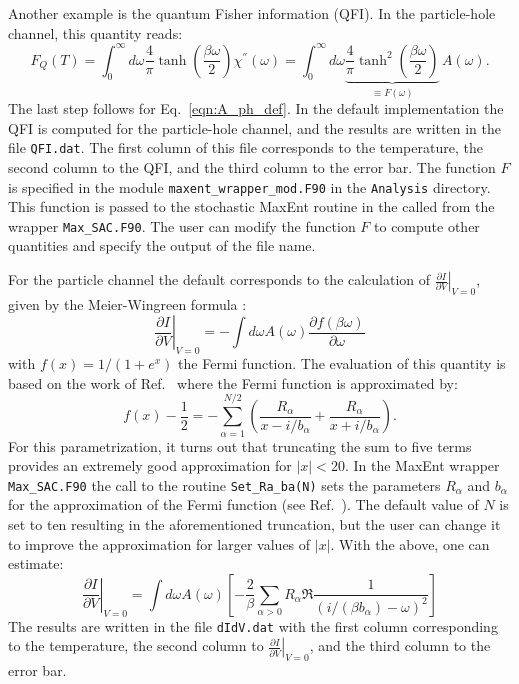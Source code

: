Another  example is  the  quantum Fisher  information \cite{Hauke16} (QFI).  In the particle-hole channel,  this  quantity  reads: 
\begin{equation}
   F_Q(T) =  \int_{0}^{\infty}   d \omega   \frac{4}{\pi} \tanh\left( \frac{\beta \omega}{2} \right) \chi^{''}(\omega)  = 
             \int_{0}^{\infty}   d \omega  \underbrace{ \frac{4}{\pi} \tanh^2\left( \frac{\beta \omega}{2} \right) }_{\equiv F(\omega) } \, A(\omega).
\end{equation}
The  last  step follows  for  Eq.~\ref{eqn:A_ph_def}.    
In the default implementation  the  QFI is computed for  the particle-hole channel, and  the results are written in the file \texttt{QFI.dat}.  The first column of this file corresponds to the temperature, the second column to the QFI, and the third column to the error bar.  The function $F$ is specified in the module \texttt{maxent\_wrapper\_mod.F90} in the  \texttt{Analysis}   directory.
This function is  passed to the stochastic MaxEnt routine in the called from the wrapper \texttt{Max\_SAC.F90}.  The user can modify the function $F$ to compute other quantities and specify the output of the file name. 

For the particle channel the  default corresponds  to the calculation of  $\left. \frac{\partial I}{\partial V}\right|_{V=0}$, given by  the 
Meier-Wingreen formula \cite{Meir92}:
\begin{equation}
 \left. \frac{\partial I}{\partial V}\right|_{V=0} = - \int d \omega A(\omega) \frac{\partial f(\beta \omega)}{\partial \omega} 
\end{equation}
with $f(x) = 1/(1+e^x)$ the Fermi function.  The  evaluation of this quantity is based on the work of Ref.~\cite{Karrasch10} where the 
Fermi function is approximated by: 
\begin{equation}
  f(x) - \frac{1}{2} = - \sum_{\alpha =1 }^{N/2} \left( \frac{R_\alpha}{x - i/ b_\alpha} + \frac{R_\alpha}{x + i /b_\alpha} \right).
\end{equation} 
For this parametrization, it turns out  that truncating the sum to five terms provides an extremely good approximation  for $|x|<20$.  
In  the MaxEnt wrapper \texttt{Max\_SAC.F90}  the call to the routine \texttt{Set\_Ra\_ba(N)} sets the parameters $R_\alpha$ and $b_\alpha$ for the approximation of the Fermi function (see Ref.~\cite{Karrasch10}).  The default value of $N$ is set to ten  resulting in the aforementioned truncation, but the user can change it to improve the approximation for larger values of $|x|$.   With the above,  one  can estimate:
\begin{equation}
   \left. \frac{\partial I}{\partial V}\right|_{V=0}  = \int d \omega A(\omega) \left[ -\frac{2}{\beta} 
   \sum_{\alpha>0}  R_\alpha \Re \frac{1}{(i/(\beta b_\alpha) - \omega)^2} \right] 
\end{equation}
The results are written in the file \texttt{dIdV.dat} with the first column corresponding to the temperature, the second column to $\left. \frac{\partial I}{\partial V}\right|_{V=0}$, and the third column to the error bar.



